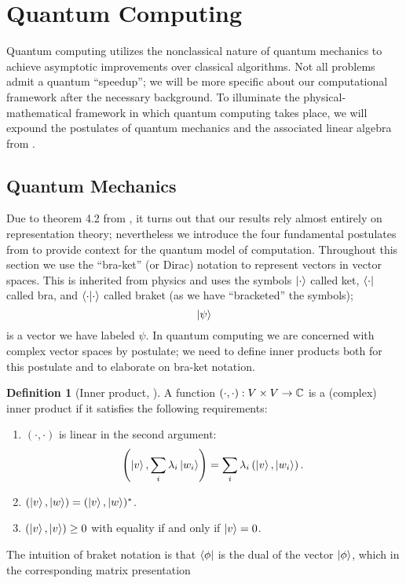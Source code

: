 \documentclass[12pt,twoside]{reedthesis}
\theoremstyle{plain}   %
\theoremstyle{definition}
\newtheorem{defn}{Definition}[section]
\theoremstyle{remark}
\numberwithin{equation}{section}
\begin{document}
  \section{Quantum Computing}
  Quantum computing utilizes the nonclassical nature of quantum mechanics to achieve asymptotic improvements over classical algorithms.
  Not all problems admit a quantum ``speedup''; we will be more specific about our computational framework after the necessary background.
  To illuminate the physical-mathematical framework in which quantum computing takes place, we will expound the postulates of quantum mechanics and the associated linear algebra from \cite[Chapter 2]{nielsen2010}.
  \subsection{Quantum Mechanics}
  Due to theorem 4.2 from \cite{copeland}, it turns out that our results rely almost entirely on representation theory;
  nevertheless we introduce the four fundamental postulates from \cite[Chapter 2]{nielsen2010} to provide context for the quantum model of computation.
  Throughout this section we use the ``bra-ket'' (or Dirac) notation to represent vectors in vector spaces. This is inherited from physics and uses the symbols
  $\ket{\cdot}$ called ket, $\bra{\cdot}$ called bra, and $\braket{\cdot | \cdot}$ called braket (as we have ``bracketed'' the symbols); 
  \[ \ket{\psi} \]
  is a vector we have labeled $\psi$. In quantum computing we are concerned with complex vector spaces by postulate; we need to define inner products both for this postulate and to elaborate on bra-ket notation.
  \begin{defn}[{Inner product, \cite[2.1.4]{nielsen2010}}]
    A function $(\cdot, \cdot): V \times V \to \mathbb{C}$ is a (complex) inner product if it satisfies the following requirements:
    \begin{enumerate}
    \item $(\cdot, \cdot)$ is linear in the second argument:
      \[ \left( \ket{v}, \sum_i \lambda_i \ket{w_i} \right) = \sum_i \lambda_i \left( \ket{v}, \ket{w_i} \right).\]
    \item $(\ket{v}, \ket{w}) = (\ket{v}, \ket{w})^*$.
    \item $(\ket{v}, \ket{v}) \geq 0$ with equality if and only if $\ket{v} = 0$.
    \end{enumerate}
  \end{defn}
  The intuition of braket notation is that $\bra{\phi}$ is the dual of the vector $\ket{\phi}$, which in the corresponding matrix presentation
\end{document}
